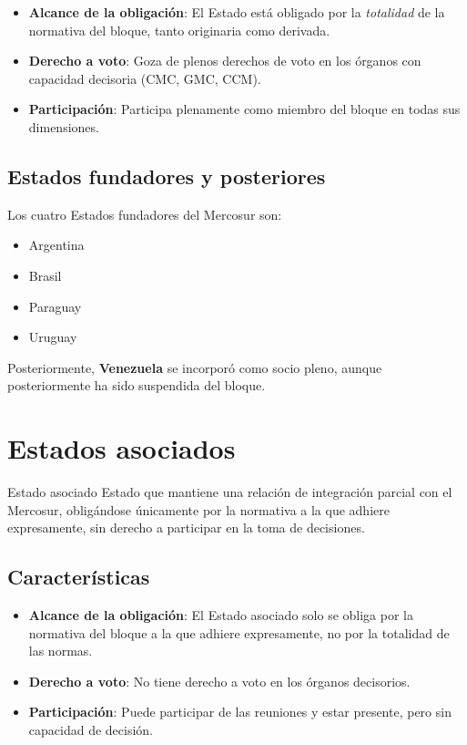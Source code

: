 \documentclass[12pt,oneside]{book}
\begin{document}
\begin{itemize}
\item \textbf{Alcance de la obligación}: El Estado está obligado por la \textit{totalidad} de la normativa del bloque, tanto originaria como derivada.
\item \textbf{Derecho a voto}: Goza de plenos derechos de voto en los órganos con capacidad decisoria (CMC, GMC, CCM).
\item \textbf{Participación}: Participa plenamente como miembro del bloque en todas sus dimensiones.
\end{itemize}

\subsection{Estados fundadores y posteriores}

Los cuatro Estados fundadores del Mercosur son:

\begin{itemize}
\item Argentina
\item Brasil
\item Paraguay
\item Uruguay
\end{itemize}

Posteriormente, \textbf{Venezuela} se incorporó como socio pleno, aunque posteriormente ha sido suspendida del bloque.

\section{Estados asociados}

\begin{definition}{Estado asociado}
Estado que mantiene una relación de integración parcial con el Mercosur, obligándose únicamente por la normativa a la que adhiere expresamente, sin derecho a participar en la toma de decisiones.
\end{definition}

\subsection{Características}

\begin{itemize}
\item \textbf{Alcance de la obligación}: El Estado asociado solo se obliga por la normativa del bloque a la que adhiere expresamente, no por la totalidad de las normas.
\item \textbf{Derecho a voto}: No tiene derecho a voto en los órganos decisorios.
\item \textbf{Participación}: Puede participar de las reuniones y estar presente, pero sin capacidad de decisión.
\end{itemize}
\end{document}
